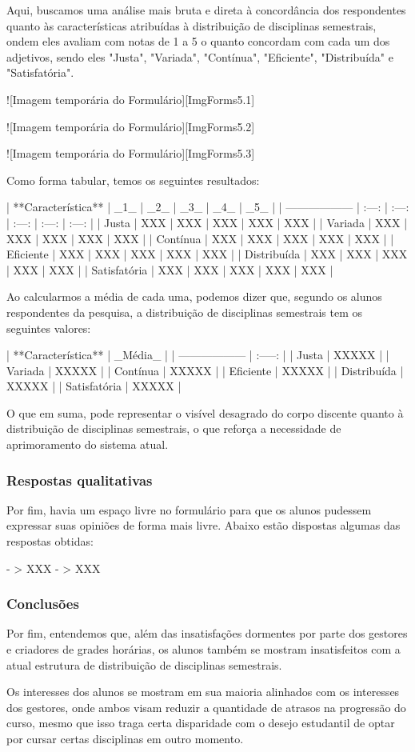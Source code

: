 Aqui, buscamos uma análise mais bruta e direta à concordância dos respondentes quanto às características atribuídas à distribuição de disciplinas semestrais, ondem eles avaliam com notas de 1 a 5 o quanto concordam com cada um dos adjetivos, sendo eles "Justa", "Variada", "Contínua", "Eficiente", "Distribuída" e "Satisfatória".

![Imagem temporária do Formulário][ImgForms5.1]

![Imagem temporária do Formulário][ImgForms5.2]

![Imagem temporária do Formulário][ImgForms5.3]

Como forma tabular, temos os seguintes resultados:

| **Característica** |  _1_  |  _2_  |  _3_  |  _4_  |  _5_  |
| ------------------ | :---: | :---: | :---: | :---: | :---: |
| Justa              |  XXX  |  XXX  |  XXX  |  XXX  |  XXX  |
| Variada            |  XXX  |  XXX  |  XXX  |  XXX  |  XXX  |
| Contínua           |  XXX  |  XXX  |  XXX  |  XXX  |  XXX  |
| Eficiente          |  XXX  |  XXX  |  XXX  |  XXX  |  XXX  |
| Distribuída        |  XXX  |  XXX  |  XXX  |  XXX  |  XXX  |
| Satisfatória       |  XXX  |  XXX  |  XXX  |  XXX  |  XXX  |

Ao calcularmos a média de cada uma, podemos dizer que, segundo os alunos respondentes da pesquisa, a distribuição de disciplinas semestrais tem os seguintes valores:

| **Característica** | _Média_ |
| ------------------ | :-----: |
| Justa              |  XXXXX  |
| Variada            |  XXXXX  |
| Contínua           |  XXXXX  |
| Eficiente          |  XXXXX  |
| Distribuída        |  XXXXX  |
| Satisfatória       |  XXXXX  |

O que em suma, pode representar o visível desagrado do corpo discente quanto à distribuição de disciplinas semestrais, o que reforça a necessidade de aprimoramento do sistema atual.

\subsubsection{Respostas qualitativas} %

Por fim, havia um espaço livre no formulário para que os alunos pudessem expressar suas opiniões de forma mais livre. Abaixo estão dispostas algumas das respostas obtidas:

- > XXX
- > XXX

\subsubsection{Conclusões} %

Por fim, entendemos que, além das insatisfações dormentes por parte dos gestores e criadores de grades horárias, os alunos também se mostram insatisfeitos com a atual estrutura de distribuição de disciplinas semestrais.

Os interesses dos alunos se mostram em sua maioria alinhados com os interesses dos gestores, onde ambos visam reduzir a quantidade de atrasos na progressão do curso, mesmo que isso traga certa disparidade com o desejo estudantil de optar por cursar certas disciplinas em outro momento.
